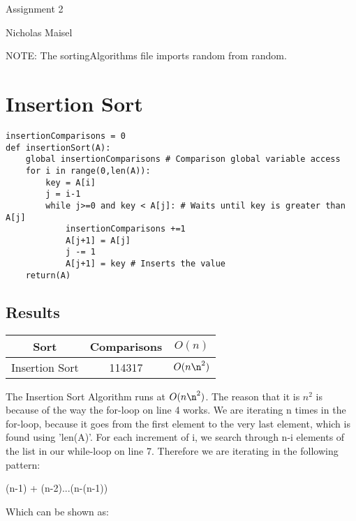 \documentclass{article}
\begin{document}
\lstset{language=Python}
\lstset{frame=lines}
\lstset{basicstyle=\footnotesize\ttfamily}

\begin{center}
\large{Assignment 2}
\vspace{2mm}

Nicholas Maisel
\end{center}

\vspace{8mm}
NOTE: The sortingAlgorithms file imports random from random.


\section{Insertion Sort}
\label{Insertion Sort}
\lstset{numbers=left}
\begin{lstlisting}
insertionComparisons = 0
def insertionSort(A):
    global insertionComparisons # Comparison global variable access
    for i in range(0,len(A)):
        key = A[i]
        j = i-1
        while j>=0 and key < A[j]: # Waits until key is greater than A[j]
            insertionComparisons +=1
            A[j+1] = A[j]
            j -= 1
            A[j+1] = key # Inserts the value
    return(A)

\end{lstlisting}
\subsection{Results}
\begin{tabular}{c|c|c}
    Sort & Comparisons & $O(n)$ \\
\hline
    Insertion Sort & 114317 & $O(n\n^2)$
\end{tabular}
\vspace{5mm}

The Insertion Sort Algorithm runs at $O(n\n^2)$. The reason that it is $n^2$ is because of the way the for-loop on line 4 works. We are iterating n times in the for-loop, because it goes from the first element to the very last element, which is found using 'len(A)'. For each increment of i,  we search through n-i elements of the list in our while-loop on line 7. Therefore we are iterating in the following pattern:
\vspace{2mm}

(n-1) + (n-2)...(n-(n-1))
\vspace{2mm}

Which can be shown as:
\vspace{3mm}
\end{document}
